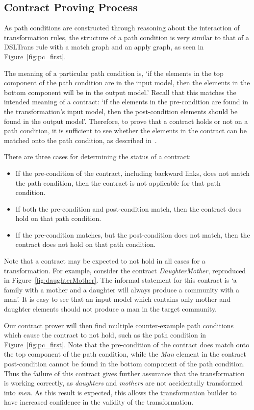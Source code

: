 \subsection{Contract Proving Process}
\label{subsub:contract_proving}

As path conditions are constructed through reasoning about the interaction of
transformation rules, the structure of a path condition is very similar to that
of a DSLTrans rule with a match graph and an apply graph, as seen in
Figure~\ref{fig:pc_first}.

The meaning of a particular path condition is, `if the elements in the top component of the path condition are in the input model, then the elements in the bottom component will be in the output model.' Recall that this matches the intended meaning of a contract: `if the elements in
the pre-condition are found in the transformation's input model, then the
post-condition elements should be found in the output model'. Therefore, to prove that a
contract holds or not on a path condition, it is sufficient to see whether the
elements in the contract can be matched onto the path condition, as described
in~\cite{Lucio2014}.


There are three cases for determining the status of a contract:
\begin{itemize}
\item If the pre-condition of the contract, including backward links, does not match the path condition, then the contract is not applicable for that path condition.
\item If both the pre-condition and post-condition match, then the contract does hold on that path condition.
\item If the pre-condition matches, but the post-condition does not match, then the contract does not hold on that path condition.
\end{itemize}

Note that a contract may be expected to not hold in all cases for a
transformation. For example, consider the contract \textit{Daughter\-Mother},
reproduced in Figure~\ref{fig:daughterMother}. The informal statement for this contract is `a family with a mother and a
daughter will always produce a community with a man'.  It is easy to see that an input model which contains only mother and
 daughter elements should not produce a man in the target community.

Our contract prover will then find multiple
 counter-example path conditions which cause the contract to not hold, such as the path condition in Figure~\ref{fig:pc_first}. Note that the
pre-condition of the contract does match onto the top component of the path condition, while the
\textit{Man} element in the contract post-condition cannot be found in the bottom component of the path condition. Thus the failure of this contract gives further
assurance that the transformation is working correctly, as \textit{daughters}
and \textit{mothers} are not accidentally transformed into \textit{men}. As this result is expected, this allows the transformation builder to have increased confidence in the validity of the transformation.


